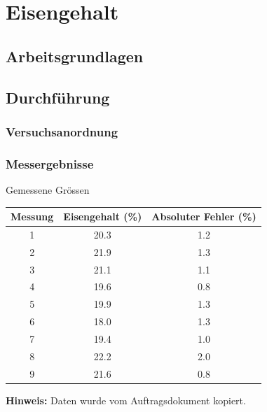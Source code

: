\section{Eisengehalt}

\subsection{Arbeitsgrundlagen}

\subsection{Durchf\"{u}hrung}

\subsubsection*{Versuchsanordnung}


\subsubsection*{Messergebnisse}

\begin{center}
    \begin{threeparttable}
        \caption{Gemessene Gr\"ossen}
        \begin{tabular}{ccc}
            \toprule
            Messung & Eisengehalt (\%) & Absoluter Fehler (\%) \\
            \midrule
            1   & 20.3  & 1.2 \\
            2   & 21.9  & 1.3 \\
            3   & 21.1  & 1.1 \\
            4   & 19.6  & 0.8 \\
            5   & 19.9  & 1.3 \\
            6   & 18.0  & 1.3 \\
            7   & 19.4  & 1.0 \\
            8   & 22.2  & 2.0 \\
            9   & 21.6  & 0.8 \\
            \bottomrule
        \end{tabular}
        \begin{tablenotes}
            \small
            \item \textbf{Hinweis:} Daten wurde vom Auftragsdokument kopiert.
        \end{tablenotes}
    \end{threeparttable}
\end{center}

